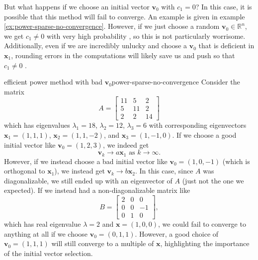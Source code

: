 \documentclass{article}
\let\vec\mathbf
\begin{document}
But what happens if we choose an initial vector $\vec{v}_0$ with $c_1 = 0$? In this case, it is possible that this method will fail to converge. An example is given in example \ref{ex:power-sparse-no-convergence}. However, if we just choose a random $\vec{v}_0 \in \mathbb{R}^n$, we get $c_1 \neq 0$ with very high probability \cite[p.~53]{cornell}, so this is not particularly worrisome. Additionally, even if we are incredibly unlucky and choose a $\vec{v}_0$ that is deficient in $\vec{x}_1$, rounding errors in the computations will likely save us and push so that $c_1 \neq 0$ \cite{pwr-rot}.

\begin{example}{efficient power method with bad $\vec{v}_0$}{power-sparse-no-convergence}
  Consider the matrix
  \begin{equation*}
    A = \begin{bmatrix}11 & 5 & 2 \\ 5 & 11 & 2 \\ 2 & 2 & 14\end{bmatrix}
  \end{equation*}
  which has eigenvalues $\lambda_1 = 18$, $\lambda_2 = 12$, $\lambda_3 = 6$ with corresponding eigenvectors $\vec{x}_1 = (1,1,1)$, $\vec{x}_2 = (1,1,-2)$, and $\vec{x}_3 = (1,-1,0)$. If we choose a good initial vector like $\vec{v}_0 = (1,2,3)$, we indeed get
  \begin{equation*}
    \vec{v}_k \to a\vec{x}_1 \textrm{  as  } k \to \infty.
  \end{equation*}
  However, if we instead choose a bad initial vector like $\vec{v}_0 = (1,0,-1)$ (which is orthogonal to $\vec{x}_1$), we instead get $\vec{v}_k \to b\vec{x}_2$. In this case, since $A$ was diagonalizable, we still ended up with an eigenvector of $A$ (just not the one we expected). If we instead had a non-diagonalizable matrix like
  \begin{equation*}
    B = \begin{bmatrix}2 & 0 & 0 \\ 0 & 0 & -1 \\ 0 & 1 & 0\end{bmatrix},
  \end{equation*}
  which has real eigenvalue $\lambda=2$ and $\vec{x} = (1,0,0)$, we could fail to converge to anything at all if we choose $\vec{v}_0 = (0,1,1)$. However, a good choice of $\vec{v}_0 = (1,1,1)$ will still converge to a multiple of $\vec{x}$, highlighting the importance of the initial vector selection.
\end{example}
\end{document}
